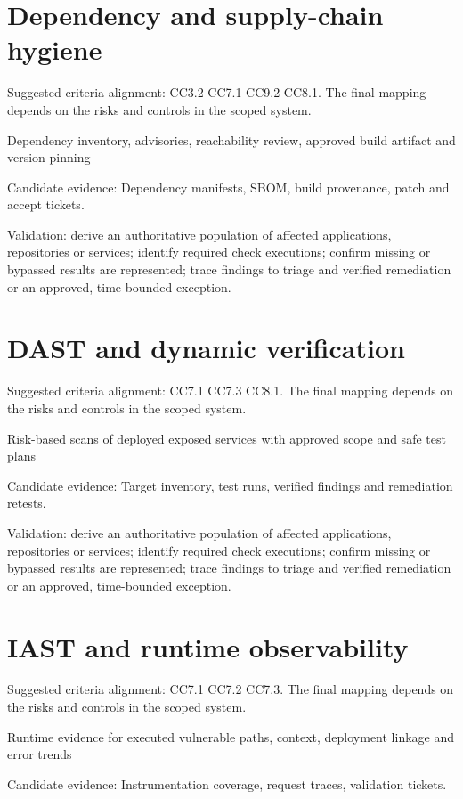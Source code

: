 \documentclass[10pt,oneside]{report}
\begin{document}
\section{Dependency and supply-chain hygiene}
Suggested criteria alignment: CC3.2 CC7.1 CC9.2 CC8.1. The final mapping depends on the risks and controls in the scoped system.

\begin{engineeringbox}
Dependency inventory, advisories, reachability review, approved build artifact and version pinning
\end{engineeringbox}
Candidate evidence: Dependency manifests, SBOM, build provenance, patch and accept tickets.

Validation: derive an authoritative population of affected applications, repositories or services; identify required check executions; confirm missing or bypassed results are represented; trace findings to triage and verified remediation or an approved, time-bounded exception.

\section{DAST and dynamic verification}
Suggested criteria alignment: CC7.1 CC7.3 CC8.1. The final mapping depends on the risks and controls in the scoped system.

\begin{engineeringbox}
Risk-based scans of deployed exposed services with approved scope and safe test plans
\end{engineeringbox}
Candidate evidence: Target inventory, test runs, verified findings and remediation retests.

Validation: derive an authoritative population of affected applications, repositories or services; identify required check executions; confirm missing or bypassed results are represented; trace findings to triage and verified remediation or an approved, time-bounded exception.

\section{IAST and runtime observability}
Suggested criteria alignment: CC7.1 CC7.2 CC7.3. The final mapping depends on the risks and controls in the scoped system.

\begin{engineeringbox}
Runtime evidence for executed vulnerable paths, context, deployment linkage and error trends
\end{engineeringbox}
Candidate evidence: Instrumentation coverage, request traces, validation tickets.
\end{document}
